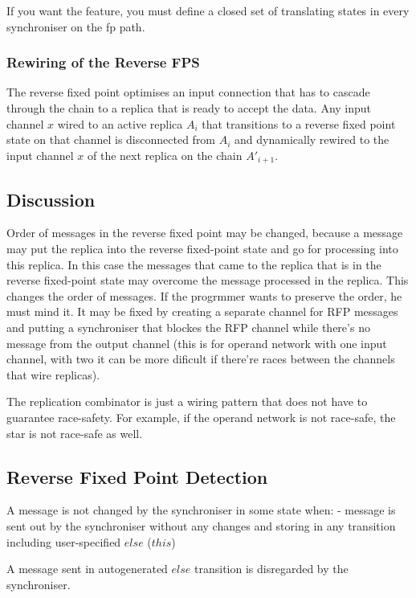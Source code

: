 If you want the feature, you must define a closed set of translating states in every synchroniser on the fp path.


\subsubsection{Rewiring of the Reverse FPS}
The reverse fixed point optimises an input connection that has to cascade through the chain to a replica that is ready to accept the data. Any input channel $x$ wired to an active replica $A_i$ that transitions to a reverse fixed point state on that channel is disconnected from $A_i$ and dynamically rewired to the input channel $x$ of the next replica on the chain $A'_{i+1}$.



    \subsection{Discussion}
Order of messages in the reverse fixed point may be changed, because a message may put the replica into the reverse fixed-point state and go for processing into this replica. In this case the messages that came to the replica that is in the reverse fixed-point state may overcome the message processed in the replica. This changes the order of messages. If the progrmmer wants to preserve the order, he must mind it. It may be fixed by creating a separate channel for RFP messages and putting a synchroniser that blockes the RFP channel while there's no message from the output channel (this is for operand network with one input channel, with two it can be more dificult if there're races between the channels that wire replicas).

The replication combinator is just a wiring pattern that does not have to guarantee race-safety. For example, if the operand network is not race-safe, the star is not race-safe as well.


    \subsection{Reverse Fixed Point Detection\label{rfp_detect}}
A message is not changed by the synchroniser in some state when:
- message is sent out by the synchroniser without any changes and storing in any transition including user-specified $else$ ($this$)

A message sent in autogenerated $else$ transition is disregarded by the synchroniser.

